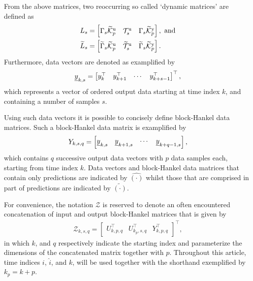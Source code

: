 %
From the above matrices, two reoccurring so called `dynamic matrices' are defined as
\begin{align*}
    L_s &= \begin{bmatrix} \Gamma_s\widetilde{\mathcal{K}}_{p}^{\mathrm{{u}}} & \mathcal{T}_s^\mathrm{u} & \Gamma_s\widetilde{\mathcal{K}}_{p}^{\mathrm{{y}}} \end{bmatrix}, \text{ and}\\
    \widetilde{L}_s &= \begin{bmatrix} \widetilde{\Gamma}_s\widetilde{\mathcal{K}}_{p}^{\mathrm{{u}}} & \widetilde{\mathcal{T}}_s^\mathrm{u} & \widetilde{\Gamma}_s\widetilde{\mathcal{K}}_{p}^{\mathrm{{y}}} \end{bmatrix}.
\end{align*}
%
Furthermore, data vectors are denoted as examplified by
\begin{align*}
    \underline{y}_{k,s} = \begin{bmatrix} y_k^\top & y_{k+1}^\top & \cdots & y_{k+s-1}^\top\end{bmatrix}^\top,
\end{align*}
which represents a vector of ordered output data starting at time index $k$, and containing a number of samples $s$.

Using such data vectors it is possible to concisely define block-Hankel data matrices. Such a block-Hankel data matrix is examplified by
\begin{align*}
    Y_{k,s,q} = \begin{bmatrix}
        \underline{y}_{k,s} & \underline{y}_{k+1,s} & \cdots & \underline{y}_{k+q-1,s}
    \end{bmatrix},
\end{align*}
which contains $q$ successive output data vectors with $p$ data samples each, starting from time index $k$. Data vectors and block-Hankel data matrices that contain only predictions are indicated by $\hat{(\cdot)}$ whilst those that are comprised in part of predictions are indicated by $\tilde{(\cdot)}$.

For convenience, the notation $\mathcal{Z}$ is reserved to denote an often encountered concatenation of input and output block-Hankel matrices that is given by
\begin{align*}
    \mathcal{Z}_{k,s,q} = \begin{bmatrix}
        U_{k,p,q}^\top & U_{k_p,s,q}^\top & Y_{k,p,q}^\top
    \end{bmatrix}^\top,
\end{align*}
in which $k$, and $q$ respectively indicate the starting index and parameterize the dimensions of the concatenated matrix together with $p$. Throughout this article, time indices $i$, $\hat{i}$, and $k$, will be used together with the shorthand exemplified by $k_p=k+p$.

